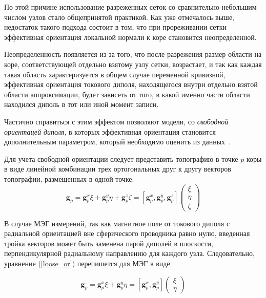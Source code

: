 По этой причине использование разреженных сеток со сравнительно небольшим числом узлов стало
общепринятой практикой. Как уже отмечалось выше, недостаток такого подхода состоит в том, что
при прореживании сетки эффективная ориентация локальной нормали к коре становится неопределенной.

Неопределенность появляется из-за того, что после разрежения размер области на коре, соответствующей отдельно
взятому узлу сетки, возрастает, и так как каждая такая область характеризуется в общем случае
переменной кривизной, эффективная ориентация токового диполя, находящегося внутри отдельно взятой области аппроксимации,
будет зависеть от того, в какой именно части области находился диполь в тот или иной момент записи.

Частично справиться с этим эффектом позволяют модели, со \emph{свободной ориентацей диполя},
в которых эффективная ориентация становится дополнительным параметром, который необходимо оценить из данных~\cite{Lin2006}.

Для учета свободной ориентации следует представить топографию в точке $p$ коры в виде линейной
комбинации трех ортогональных друг к другу векторов топографии, размещенных в одной точке:
\begin{equation}
    \mathbf{g}_p = \mathbf{g}_p^x \xi + \mathbf{g}_p^y \eta + \mathbf{g}_p^z \zeta = [\mathbf{g}_p^x, \mathbf{g}_p^y, \mathbf{g}_p^z] \left(
    \begin{array}{ccc}
        \xi \\
        \eta \\
        \zeta
    \end{array}
    \right)
    \label{loose_or}
\end{equation}

В случае МЭГ измерений, так как магнитное поле от токового диполя с радиальной ориентацией вне сферического проводника равно нулю,
введенная тройка векторов может быть заменена парой диполей в плоскости, перпендикулярной радиальному направлению для каждого узла.
Следовательно, уравнение (\ref{loose_or}) перепишется для МЭГ в виде

\begin{equation}
    \mathbf{g}_p = \mathbf{g}_p^x \xi + \mathbf{g}_p^y \eta = [\mathbf{g}_p^x, \mathbf{g}_p^y] \left(
    \begin{array}{ccc}
        \xi \\
        \eta
    \end{array}
    \right)
    \label{loose_or_meg}
\end{equation}

